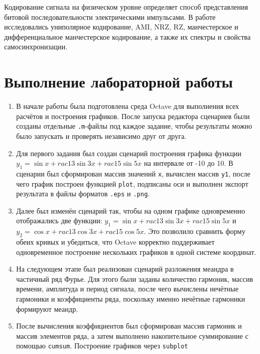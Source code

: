 \documentclass[
  english,
  russian,
  12pt,
  a4paper,
  DIV=11,
  numbers=noendperiod]{scrreprt}
\begin{document}
Кодирование сигнала на физическом уровне определяет способ представления
битовой последовательности электрическими импульсами. В работе
исследовались униполярное кодирование, AMI, NRZ, RZ, манчестерское и
дифференциальное манчестерское кодирование, а также их спектры и
свойства самосинхронизации.

\chapter{Выполнение лабораторной
работы}\label{ux432ux44bux43fux43eux43bux43dux435ux43dux438ux435-ux43bux430ux431ux43eux440ux430ux442ux43eux440ux43dux43eux439-ux440ux430ux431ux43eux442ux44b}

\begin{enumerate}
\def\labelenumi{\arabic{enumi}.}
\item
  В начале работы была подготовлена среда Octave для выполнения всех
  расчётов и построения графиков. После запуска редактора сценариев были
  созданы отдельные \texttt{.m}-файлы под каждое задание, чтобы
  результаты можно было запускать и проверять независимо друг от друга.
\item
  Для первого задания был создан сценарий построения графика функции
  \(y_1 = \sin x + rac{1}{3}\sin 3x + rac{1}{5}\sin 5x\) на интервале от
  -10 до 10. В сценарии был сформирован массив значений \texttt{x},
  вычислен массив \texttt{y1}, после чего график построен функцией
  \texttt{plot}, подписаны оси и выполнен экспорт результата в файлы
  форматов \texttt{.eps} и \texttt{.png}.
\item
  Далее был изменён сценарий так, чтобы на одном графике одновременно
  отображались две функции:
  \(y_1 = \sin x + rac{1}{3}\sin 3x + rac{1}{5}\sin 5x\) и
  \(y_2 = \cos x + rac{1}{3}\cos 3x + rac{1}{5}\cos 5x\). Это позволило
  сравнить форму обеих кривых и убедиться, что Octave корректно
  поддерживает одновременное построение нескольких графиков в одной
  системе координат.
\item
  На следующем этапе был реализован сценарий разложения меандра в
  частичный ряд Фурье. Для этого были заданы количество гармоник, массив
  времени, амплитуда и период сигнала, после чего вычислены нечётные
  гармоники и коэффициенты ряда, поскольку именно нечётные гармоники
  формируют меандр.
\item
  После вычисления коэффициентов был сформирован массив гармоник и
  массив элементов ряда, а затем выполнено накопительное суммирование с
  помощью \texttt{cumsum}. Построение графиков через \texttt{subplot}

\end{enumerate}
\end{document}

